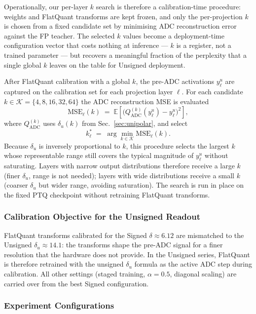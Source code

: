 \documentclass[a4paper,11pt,oneside]{article}
\theoremstyle{breakstyle}
\begin{document}
  Operationally, our per-layer $k$ search is therefore a
  calibration-time procedure: weights and FlatQuant transforms are
  kept frozen, and only the per-projection $k$ is chosen from a
  fixed candidate set by minimising ADC reconstruction error
  against the FP teacher.  The selected $k$ values become a
  deployment-time configuration vector that costs nothing at
  inference --- $k$ is a register, not a trained parameter --- but
  recovers a meaningful fraction of the perplexity that a single
  global $k$ leaves on the table for Unsigned deployment.

  After FlatQuant calibration with a global $k$, the pre-ADC
  activations $y^u_\ell$ are captured on the calibration set for each
  projection layer $\ell$. For each candidate $k \in \mathcal{K} = \{4,
  8, 16, 32, 64\}$ the ADC reconstruction MSE is evaluated
  \[
    \mathrm{MSE}_\ell(k) \;=\; \mathbb{E}\!\left[
      \bigl( Q^{(k)}_{\mathrm{ADC}}(y^u_\ell) - y^u_\ell \bigr)^2
    \right],
  \]
  where $Q^{(k)}_{\mathrm{ADC}}$ uses $\delta_u(k)$ from
  Sec.~\ref{sec:unipolar}, and select
  \[
    k^*_\ell \;=\; \arg\min_{k \in \mathcal{K}} \mathrm{MSE}_\ell(k).
  \]
  Because $\delta_u$ is inversely proportional to $k$, this procedure
  selects the largest $k$ whose representable range still covers the
  typical magnitude of $y^u_\ell$ without saturating. Layers with
  narrow output distributions therefore receive a large
  $k$ (finer $\delta_u$, range is not needed); layers with wide
  distributions receive a small $k$ (coarser $\delta_u$ but
  wider range, avoiding saturation). The search is run in place on
  the fixed PTQ checkpoint without retraining FlatQuant transforms.

  \subsubsection{Calibration Objective for the Unsigned Readout}

  FlatQuant transforms calibrated for the Signed
  $\delta \approx 6.12$ are mismatched to the Unsigned
  $\delta_u \approx 14.1$: the transforms shape the pre-ADC signal
  for a finer resolution that the hardware does not provide.  In
  the Unsigned series, FlatQuant is therefore retrained with the
  unsigned $\delta_u$ formula as the active ADC step during
  calibration.  All other settings (staged training,
  $\alpha = 0.5$, diagonal scaling) are carried over from the best
  Signed configuration.

  \subsubsection{Experiment Configurations}
\end{document}
